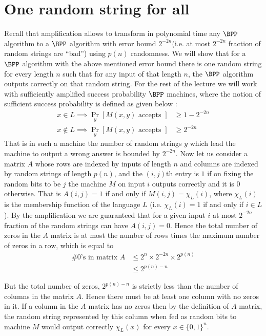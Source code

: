 \section{One random string for all}
Recall that amplification allows to transform in polynomial time any
$\BPP$ algorithm to a $\BPP$ algorithm with error bound
$2^{-2n}$(i.e. at most $2^{-2n}$ fraction of random strings are ``bad'')
using $p(n)$ randomness. We will show that for a $\BPP$ algorithm with
the above mentioned error bound there is one random string for every
length $n$ such that for any input of that length $n$, the $\BPP$
algorithm outputs correctly on that random string. For the rest of the
lecture we will work with sufficiently amplified success probability
$\BPP$ machines, where the notion of sufficient success probability is
defined as given below :
\begin{align}
  x\in L \implies \Pr_{y} \left[ M(x,y) \text{ accepts } \right] & \geq
   1-2^{-2n} \\
  x \notin L \implies \Pr_{y}\left[ M(x,y) \text{ accepts } \right] & \geq
   2^{-2n} 
\end{align}
That is in such a machine the number of random strings $y$ which lead
the machine to output a wrong answer is bounded by $2^{-2n}$. Now let
us consider a matrix $A$ whose rows are indexed by inputs of length
$n$ and columns are indexed by random strings of length $p(n)$, and
the $(i,j)$th entry is $1$ if on fixing the random bits to be $j$ the
machine $M$ on input $i$ outputs correctly and it is $0$
otherwise. That is $A(i,j)=1$ if and only if $M(i,j)=\chi_L(i)$, where
$\chi_L(i)$ is the membership function of the language $L$
(i.e. $\chi_L(i)=1$ if and only if $i\in L$). By the amplification we
are guaranteed that for a given input $i$ at most $2^{-2n}$ fraction
of the random strings can have $A(i,j)=0$. Hence the total number of
zeros in the $A$ matrix is at most the number of rows times the
maximum number of zeros in a row, which is equal to 
\begin{eqnarray*}
  \text{\# 0's in matrix }A & \leq 2^n \times 2^{-2n} \times 2^{p(n)}
  \\
                            & \leq 2^{p(n)-n}
\end{eqnarray*}

But the total number of zeros, $2^{p(n)-n}$ is strictly less than the
number of columns in the matrix $A$. Hence there must be at least one
column with no zeros in it. If a column in the $A$ matrix has no zeros
then by the definition of $A$ matrix, the random string represented by
this column when fed as random bits to machine $M$ would output
correctly $\chi_L(x)$ for every $x\in \{0,1\}^{n}$.

